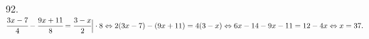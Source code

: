 92. $\cfrac{3x-7}{4}-\cfrac{9x+11}{8}=\cfrac{3-x}{2}\Big|\cdot8\Leftrightarrow 2(3x-7)-(9x+11)=4(3-x)\Leftrightarrow6x-14-9x-11=12-4x\Leftrightarrow
x=37.$\\
